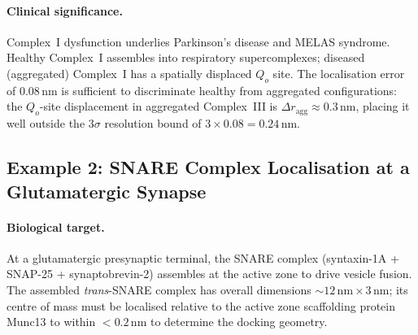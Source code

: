 \paragraph{Clinical significance.}
Complex~I dysfunction underlies Parkinson's disease and MELAS syndrome.
Healthy Complex~I assembles into respiratory supercomplexes; diseased
(aggregated) Complex~I has a spatially displaced $Q_o$ site.  The
localisation error of $0.08\,\text{nm}$ is sufficient to discriminate
healthy from aggregated configurations: the $Q_o$-site displacement in
aggregated Complex~III is $\Delta r_\text{agg} \approx 0.3\,\text{nm}$,
placing it well outside the $3\sigma$ resolution bound of $3 \times 0.08
= 0.24\,\text{nm}$.

\subsection{Example 2: SNARE Complex Localisation at a Glutamatergic Synapse}
\label{sec:ch06-example-snare}

\paragraph{Biological target.}
At a glutamatergic presynaptic terminal, the SNARE complex (syntaxin-1A +
SNAP-25 + synaptobrevin-2) assembles at the active zone to drive vesicle
fusion.  The assembled \textit{trans}-SNARE complex has overall dimensions
$\sim 12\,\text{nm} \times 3\,\text{nm}$; its centre of mass must be
localised relative to the active zone scaffolding protein Munc13 to within
$<0.2\,\text{nm}$ to determine the docking geometry.

